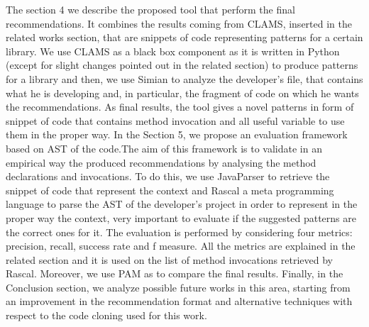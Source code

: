 The section 4 we describe the proposed tool that perform the final recommendations. It combines the results coming from CLAMS, inserted in the related works section, that are snippets of code representing patterns for a certain library. We use CLAMS as a black box component as it is written in Python (except for slight changes pointed out in the related section) to produce patterns for a library and then, we use Simian to analyze the developer's file, that contains what he is developing and, in particular, the fragment of code on which he wants the recommendations. As final results, the tool gives a novel patterns in form of snippet of code that contains method invocation and all useful variable to use them in the proper way. In the Section 5, we propose an evaluation framework based on AST of the code.The aim of this framework is to validate in an empirical way the produced recommendations by analysing the method declarations and invocations. To do this, we use JavaParser to retrieve the snippet of code that represent the context and Rascal a meta programming language to parse the AST of the developer's project in order to represent in the proper way the context, very important to evaluate if the suggested patterns are the correct ones for it. The evaluation is performed by considering four metrics: precision, recall, success rate and f measure. All the metrics are explained in the related section and it is used on the list of method invocations retrieved by Rascal. Moreover, we use PAM as to compare the final results. Finally, in the Conclusion section, we analyze possible future works in this area, starting from an improvement in the recommendation format and alternative techniques with respect to the code cloning used for this work.
